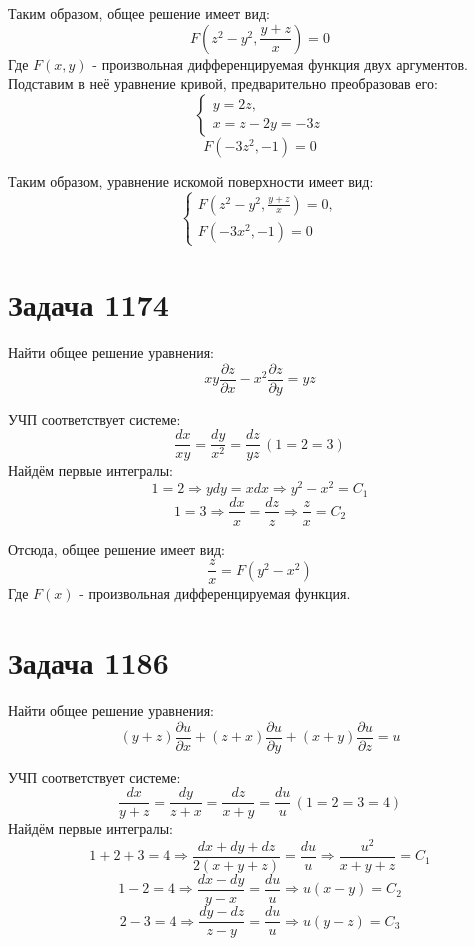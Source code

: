 \documentclass[11pt]{article}
\begin{document}
Таким образом, общее решение имеет вид:
$$F\left(z^2 - y^2, \frac{y + z}{x}\right) = 0$$
Где \(F(x, y)\) - произвольная дифференцируемая функция двух аргументов. Подставим в неё уравнение кривой,
предварительно преобразовав его:
\begin{equation*}
  \begin{cases}
    y = 2z,\\
    x = z - 2y = -3z
  \end{cases}
\end{equation*}
$$F(-3z^2, -1) = 0$$

Таким образом, уравнение искомой поверхности имеет вид:
\begin{equation*}
  \begin{cases}
    F\left(z^2 - y^2, \frac{y + z}{x}\right) = 0,\\
    F(-3x^2, -1) = 0
  \end{cases}
\end{equation*}

\section{Задача 1174}
\label{sec:org290b7e3}
Найти общее решение уравнения:
$$xy\frac{\partial{z}}{\partial{x}} - x^2\frac{\partial{z}}{\partial{y}} = yz$$

УЧП соответствует системе:
$$\frac{dx}{xy} = \frac{dy}{x^2} = \frac{dz}{yz} \, (1 = 2 = 3)$$
Найдём первые интегралы:
$$1 = 2 \Rightarrow ydy = xdx \Rightarrow y^2 - x^2 = C_1$$
$$1 = 3 \Rightarrow \frac{dx}{x} = \frac{dz}{z} \Rightarrow \frac{z}{x} = C_2$$

Отсюда, общее решение имеет вид:
$$\frac{z}{x} = F(y^2 - x^2)$$
Где \(F(x)\) - произвольная дифференцируемая функция.

\section{Задача 1186}
\label{sec:orgf8baefb}
Найти общее решение уравнения:
$$(y + z)\frac{\partial{u}}{\partial{x}} + (z + x)\frac{\partial{u}}{\partial{y}} + (x + y)\frac{\partial{u}}{\partial{z}} = u$$

УЧП соответствует системе:
$$\frac{dx}{y + z} = \frac{dy}{z + x} = \frac{dz}{x + y} = \frac{du}{u} \, (1 = 2 = 3 = 4)$$
Найдём первые интегралы:
$$1 + 2 + 3 = 4 \Rightarrow \frac{dx + dy + dz}{2(x + y + z)} = \frac{du}{u} \Rightarrow \frac{u^2}{x + y + z} = C_1$$
$$1 - 2 = 4 \Rightarrow \frac{dx - dy}{y - x} = \frac{du}{u} \Rightarrow u(x - y) = C_2$$
$$2 - 3 = 4 \Rightarrow \frac{dy - dz}{z - y} = \frac{du}{u} \Rightarrow u(y - z) = C_3$$
\end{document}
